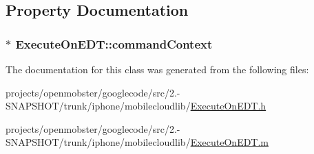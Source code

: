 \subsection{\-Property \-Documentation}
\hypertarget{interface_execute_on_e_d_t_aa9cc42fe3c21be740000149cff92c6e3}{
\subsubsection[{command\-Context}]{ $\ast$ \-Execute\-On\-E\-D\-T\-::command\-Context}}
\label{interface_execute_on_e_d_t_aa9cc42fe3c21be740000149cff92c6e3}


\-The documentation for this class was generated from the following files\-:\begin{DoxyCompactItemize}
\item 
projects/openmobster/googlecode/src/2.-\/\-S\-N\-A\-P\-S\-H\-O\-T/trunk/iphone/mobilecloudlib/\hyperlink{_execute_on_e_d_t_8h}{\-Execute\-On\-E\-D\-T.\-h}\item 
projects/openmobster/googlecode/src/2.-\/\-S\-N\-A\-P\-S\-H\-O\-T/trunk/iphone/mobilecloudlib/\hyperlink{_execute_on_e_d_t_8m}{\-Execute\-On\-E\-D\-T.\-m}\end{DoxyCompactItemize}
